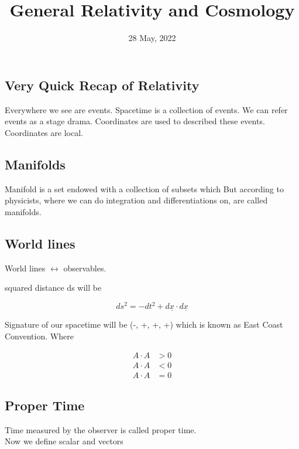 \documentclass[12pt, letterpaper]{article}
\title {General Relativity and Cosmology}
\author{}
\date{28 May, 2022}
\newcommand*{\1}{\hspace{1pt}}
\begin{document}
    \maketitle

    \subsection*{Very Quick Recap of Relativity}
    
    Everywhere we see are events. Spacetime is a collection of events. We can refer events as a stage drama. Coordinates are used to described these events. 
    Coordinates are local.  

    \subsection*{Manifolds}
    Manifold is a set endowed with a collection of subsets which 
    But according to physicists, where we can do integration and differentiations on, are called manifolds.

    \subsection*{World lines}
    World lines $\longleftrightarrow$ observables.
    
    squared distance ds will be 

    \begin{equation}
        ds^{2} = -dt^{2} + d\underline{x} \cdot d\underline{x}  
    \end{equation}

    Signature of our spacetime will be (-, +, +, +) which is known as East Coast Convention. Where

    \begin{align*} 
            A \cdot A & > 0 \tag*{spacelike} \\ 
            A \cdot A & < 0 \tag*{timelike} \\ 
            A \cdot A & = 0 \tag*{null or lightlike} 
    \end{align*}

    \subsection*{Proper Time}
    Time measured by the observer is called proper time. \\

    Now we define scalar and vectors 
\end{document}
